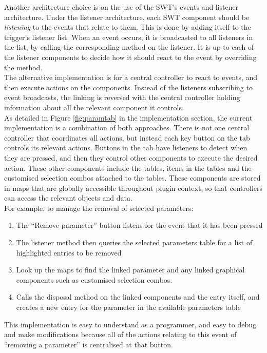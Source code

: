 Another architecture choice is on the use of the SWT's events and listener architecture. Under the listener architecture, each SWT component should be \textit{listening} to the events that relate to them. This is done by adding itself to the trigger's listener list. When an event occurs, it is broadcasted to all listeners in the list, by calling the corresponding method on the listener. It is up to each of the listener components to decide how it should react to the event by overriding the method.\\
The alternative implementation is for a central controller to react to events, and then execute actions on the components. Instead of the listeners subscribing to event broadcasts, the linking is reversed with the central controller holding information about all the relevant component it controls.\\
As detailed in Figure \ref{fig:paramtab} in the implementation section, the current implementation is a combination of both approaches. There is not one central controller that coordinates all actions, but instead each key button on the tab controls its relevant actions. Buttons in the tab have listeners to detect when they are pressed, and then they control other components to execute the desired action. These other components include the tables, items in the tables and the customised selection combos attached to the tables. These components are stored in maps that are globally accessible throughout plugin context, so that controllers can access the relevant objects and data.\\
For example, to manage the removal of selected parameters:
\begin{enumerate}
\item The ``Remove parameter'' button listens for the event that it has been pressed
\item The listener method then queries the selected parameters table for a list of highlighted entries to be removed
\item Look up the maps to find the linked parameter and any linked graphical components such as customised selection combos. 
\item Calls the disposal method on the linked components and the entry itself, and creates a new entry for the parameter in the available parameters table
\end{enumerate}
This implementation is easy to understand as a programmer, and easy to debug and make modifications because all of the actions relating to this event of ``removing a parameter'' is centralised at that button.\\
